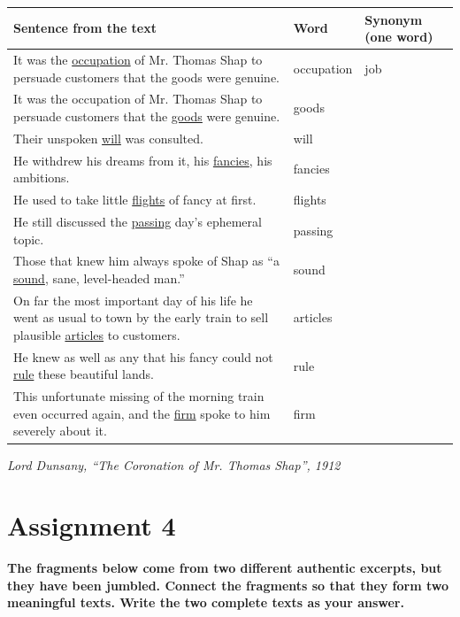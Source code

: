 \documentclass[11pt,a4paper]{article}
\newcommand{\source}[1]{\hfill{\footnotesize\emph{#1}}}
\begin{document}
\begin{tabularx}{\textwidth}{|Y|p{0.22\textwidth}|p{0.22\textwidth}|}
\hline
\textbf{Sentence from the text} & \textbf{Word} & \textbf{Synonym (one word)} \\
\hline
It was the \uline{occupation} of Mr. Thomas Shap to persuade customers that the goods were genuine. & occupation & job \\
\hline
It was the occupation of Mr. Thomas Shap to persuade customers that the \uline{goods} were genuine. & goods & \\
\hline
Their unspoken \uline{will} was consulted. & will & \\
\hline
He withdrew his dreams from it, his \uline{fancies}, his ambitions. & fancies & \\
\hline
He used to take little \uline{flights} of fancy at first. & flights & \\
\hline
He still discussed the \uline{passing} day's ephemeral topic. & passing & \\
\hline
Those that knew him always spoke of Shap as “a \uline{sound}, sane, level-headed man.” & sound & \\
\hline
On far the most important day of his life he went as usual to town by the early train to sell plausible \uline{articles} to customers. & articles & \\
\hline
He knew as well as any that his fancy could not \uline{rule} these beautiful lands. & rule & \\
\hline
This unfortunate missing of the morning train even occurred again, and the \uline{firm} spoke to him severely about it. & firm & \\
\hline
\end{tabularx}

\source{Lord Dunsany, “The Coronation of Mr. Thomas Shap”, 1912}

\newpage
\section{Assignment 4}

\textbf{The fragments below come from two different authentic excerpts, but they have been jumbled. Connect the fragments so that they form two meaningful texts. Write the two complete texts as your answer.}
\end{document}
